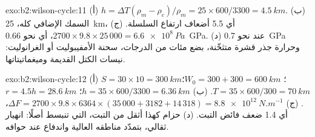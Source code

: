 \begin{solution}{exo:b2:wilson-cycle:11}
(أ) $h = \Delta T(\rho_m - \rho_c)/\rho_m = 25\times600/3300 = \qty{4.5}{km}$. (ب) السمك الإضافي كله،
\qty{25}{km}، أي 5.5 أضعاف ارتفاع السلسلة. (ج) $2700\times9.8\times25\,000 =
\qty{6.6e8}{Pa}$، أي نحو \qty{0.66}{GPa}. (د) عند نحو \qty{0.7}{GPa} وحرارة
جذر قشرة متثخّنة، بضع مئات من الدرجات، سحنة الأمفيبوليت أو
الغرانوليت: نيسات الكتل القديمة وميغماتيتاتها.
\end{solution}

\begin{solution}{exo:b2:wilson-cycle:12}
(أ) $S = 30\times10 = \qty{300}{km}$؛ $W_0 = 300 + 300 = \qty{600}{km}$؛ $T = 35\times600/300 =
\qty{70}{km}$. (ب) $h = 35\times600/3300 = \qty{6.36}{km}$؛ $r = 4.5h = \qty{28.6}{km}$.
(ج) $\Delta F = 2700\times9.8\times6364\times(35\,000 + 3182 + 14\,318) =
\qty{8.8e12}{N.m^{-1}}$، أي 1.4 ضعف فائض التبت. (د) حزام كهذا أثقل من التبت، التي
تنبسط أصلًا: انهيار ثقالي، بتمدّد مناطقه العالية واندفاع عند حوافه.
\end{solution}

